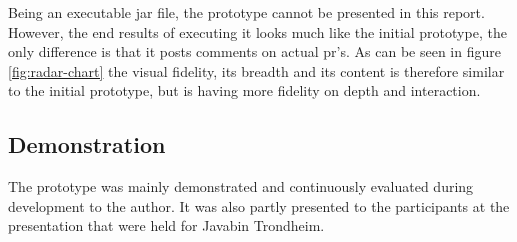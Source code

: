 \documentclass[pdftex,10pt,b5paper,twoside]{report}
\begin{document}
Being an executable jar file, the prototype cannot be presented in this report. However, the end results of executing it looks much like the initial prototype, the only difference is that it posts comments on actual \gls{pr}'s. As can be seen in figure \ref{fig:radar-chart} the visual fidelity, its breadth and its content is therefore similar to the initial prototype, but is having more fidelity on depth and interaction.  

\subsection*{Demonstration}
The prototype was mainly demonstrated and continuously evaluated during development to the author. It was also partly presented to the participants at the presentation that were held for Javabin Trondheim.
\end{document}
